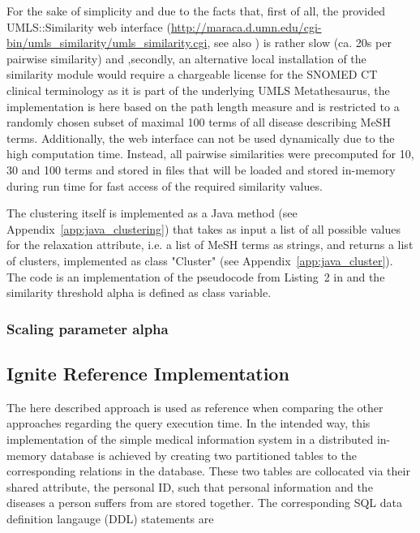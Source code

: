 For the sake of simplicity and due to the facts that, first of all, the provided UMLS::Similarity web interface
(\url{http://maraca.d.umn.edu/cgi-bin/umls_similarity/umls_similarity.cgi}, see also \citep{UMLS::Sim}) is rather slow (ca. 20s per pairwise similarity) and
,secondly, an alternative local installation of the similarity module \citep{McInnes2009} would require a chargeable license for the SNOMED CT clinical 
terminology as it is part of the underlying UMLS Metathesaurus, the implementation is here based on the path length measure and is restricted to a randomly
chosen subset of maximal 100 terms of all disease describing MeSH terms. Additionally, the web interface can not be used dynamically due to the high
computation time. Instead, all pairwise similarities were precomputed for 10, 30 and 100 terms and stored in files that will be loaded and stored in-memory 
during run time for fast access of the required similarity values.

The clustering itself is implemented as a Java method (see Appendix~\ref{app:java_clustering}) that takes as input a list of all possible values for the
relaxation attribute, i.e. a list of MeSH terms as strings, and returns a list of clusters, implemented as class "Cluster" (see
Appendix~\ref{app:java_cluster}). The code is an implementation of the pseudocode from Listing~2 in \cite{Wiese2014} and the similarity threshold alpha is
defined as class variable.


\subsubsection{Scaling parameter alpha}


\subsection{Ignite Reference Implementation}
\label{sec:impl_refimpl}
The here described approach is used as reference when comparing the other approaches regarding the query execution time. In the intended way, this
implementation of the simple medical information system in a distributed in-memory  database is achieved by creating two partitioned tables
to the corresponding relations in the database. These two tables are collocated via their shared attribute, the personal ID, such that personal information and
the diseases a person suffers from are stored together. The corresponding SQL data definition langauge (DDL) statements are

